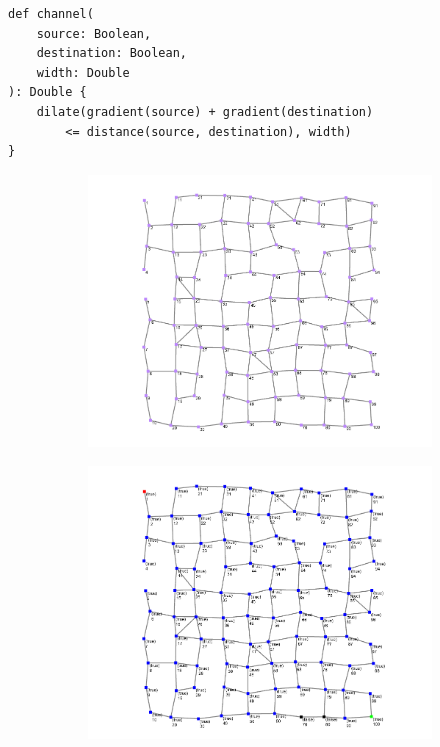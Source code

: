 \documentclass[12pt,a4paper,openright,twoside]{book}
\begin{document}
\begin{lstlisting}[caption={A ScaFi AC program example. The algorithm implements a channel between a source and a destination.}, label={lst:channel}]
def channel(
    source: Boolean, 
    destination: Boolean, 
    width: Double
): Double {
    dilate(gradient(source) + gradient(destination) 
        <= distance(source, destination), width)
}
\end{lstlisting}

\begin{figure}[h!]
    \centering
    \begin{subfigure}[b]{0.49\textwidth}
        \centering
        \includegraphics[width=\textwidth]{figures/channel1.png}
    \end{subfigure}
    \hfill
    \begin{subfigure}[b]{0.49\textwidth}
        \centering
        \includegraphics[width=\textwidth]{figures/channel2.png}

\end{subfigure}
\end{figure}
\end{document}
